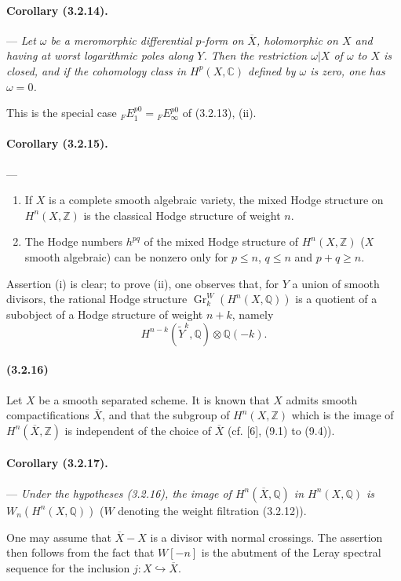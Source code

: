 \documentclass[10pt]{article}
\newcommand{\C}{\mathbb C}
\newcommand{\Q}{\mathbb Q}
\newcommand{\Z}{\mathbb Z}
\newcommand{\Gr}{\operatorname{Gr}}
\begin{document}
\paragraph{Corollary (3.2.14).} --- {\itshape Let $\omega$ be a meromorphic differential $p$-form on $\overline X$, holomorphic on $X$ and having at worst logarithmic poles along $Y$. Then the restriction $\omega|X$ of $\omega$ to $X$ is closed, and if the cohomology class in $H^p(X,\C)$ defined by $\omega$ is zero, one has $\omega=0$.}

This is the special case ${}_FE_1^{p0}={}_FE_\infty^{p0}$ of (3.2.13), (ii).

\paragraph{Corollary (3.2.15).} --- {\itshape
\begin{enumerate}[label=(\roman*),font=\itshape]
\item If $X$ is a complete smooth algebraic variety, the mixed Hodge structure on $H^n(X,\Z)$ is the classical Hodge structure of weight $n$.
\item The Hodge numbers $h^{pq}$ of the mixed Hodge structure of $H^n(X,\Z)$ ($X$ smooth algebraic) can be nonzero only for $p\le n$, $q\le n$ and $p+q\ge n$.
\end{enumerate}}
Assertion (i) is clear; to prove (ii), one observes that, for $Y$ a union of smooth divisors, the rational Hodge structure $\Gr_k^W(H^n(X,\Q))$ is a quotient of a subobject of a Hodge structure of weight $n+k$, namely
\[
H^{n-k}(\widetilde Y^k,\Q)\otimes\Q(-k).
\]

\paragraph{(3.2.16)} Let $X$ be a smooth separated scheme. It is known that $X$ admits smooth compactifications $\overline X$, and that the subgroup of $H^n(X,\Z)$ which is the image of $H^n(\overline X,\Z)$ is independent of the choice of $\overline X$ (cf. [6], (9.1) to (9.4)).

\paragraph{Corollary (3.2.17).} --- {\itshape Under the hypotheses (3.2.16), the image of $H^n(\overline X,\Q)$ in $H^n(X,\Q)$ is} $W_n(H^n(X,\Q))$ ($W$ denoting the weight filtration (3.2.12)).

One may assume that $\overline X-X$ is a divisor with normal crossings. The assertion then follows from the fact that $W[-n]$ is the abutment of the Leray spectral sequence for the inclusion $j:X\hookrightarrow\overline X$.
\end{document}
